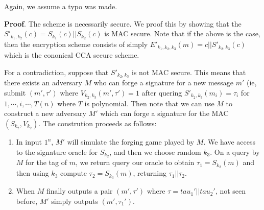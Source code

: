 \documentclass{article}
\begin{document}
\begin{enumerate}[,start=2]
\begin{enumerate}[,label=\alph*.]
Again, we assume a typo was made.%

\begin{mdbmarginx}{1ex}{0pt}{1ex}{0pt}%
\noindent{}\textbf{Proof}.  The scheme is necessarily secure. We proof this by showing that the $S'_{k_1,k_2}(c) = S_{k_1}(c) || S_{k_2}(c)$
is MAC secure. Note that if the above is the case, then the encryption scheme consists of simply
$E'_{k_1,k_2,k_3}(m) = c || S'_{k_2,k_3}(c)$ which is the cononical CCA secure scheme.%

For a contradiction, suppose that $S'_{k_2,k_3}$ is not MAC secure. This means that there exists an
adversary $M$ who can forge a signature for a new message $m'$ (ie, submit $(m',\tau')$ where
$V_{k_2,k_3}(m', \tau') = 1$ after quering $S'_{k_2,k_3}(m_i) = \tau_i$ for $1,\cdots,i,\cdots, T(n)$
where $T$ is polynomial. Then note that we can use $M$ to construct a new adversary $M'$ which can
forge a signature for the MAC $(S_{k_2},V_{k_2})$. The constrution proceeds as follows:%

\begin{enumerate}[noitemsep,topsep=\mdcompacttopsep]%

\item{}In input $1^n$, $M'$ will simulate the forging game played by $M$. We have access to the 
signature oracle for $S_{k_2}$, and then we choose random $k_3$. On a query by $M$ for the 
tag of $m$, we return query our oracle to obtain $\tau_1 = S_{k_2}(m)$ and then using $k_3$ 
compute $\tau_2 = S_{k_3}(m)$, returning $\tau_1 || \tau_2$.%

\item{}When $M$ finally outputs a pair $(m',\tau')$ where $\tau = tau_1' || tau_2'$, not seen before,
$M'$ simply outputs $(m',\tau_1')$.%
\end{enumerate}%


\end{mdbmarginx}
\end{enumerate}
\end{enumerate}
\end{document}
